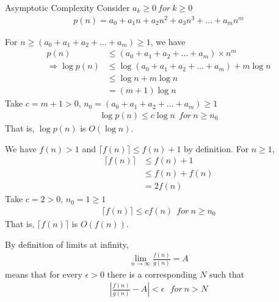 \begin{homeworkProblem}{Asymptotic Complexity}
    Consider $a_k \geq 0~for~k \geq 0$
    \[
        \begin{split}
            p(n) = a_0 + a_1n + a_2n^2 + a_3n^3 + \dots + a_mn^m
        \end{split}
    \]

    For $n \geq (a_0 + a_1 + a_2 + \dots + a_m) \geq 1$, we have
    \[
        \begin{split}
            p(n) &\leq (a_0 + a_1 + a_2 + \dots + a_m) \times n^m
            \\
            \Rightarrow \log p(n) &\leq \log (a_0 + a_1 + a_2 + \dots + a_m) + m\log n
            \\
            &\leq \log n + m \log n
            \\
            &= (m+1) \log n
        \end{split}
    \]
    Take $c = m+1 > 0$, $n_0 = (a_0 + a_1 + a_2 + \dots + a_m) \geq 1$
    \[
        \begin{split}
            \log p(n) \leq c\log n~~for~n \geq n_0
        \end{split}
    \]
    That is, $\log p(n)$ is $O(\log n)$.


    We have $f(n) > 1$ and $\lceil f(n) \rceil \leq f(n) + 1$ by definition. For $n \geq 1$,
    \[
        \begin{split}
            \lceil f(n) \rceil &\leq f(n) + 1
            \\
            &\leq f(n) + f(n)
            \\
            &= 2f(n)
        \end{split}
    \]
    Take $c = 2 > 0$, $n_0 = 1 \geq 1$
    \[
        \begin{split}
            \lceil f(n) \rceil \leq cf(n)~~for~n \geq n_0
        \end{split}
    \]
    That is, $\lceil f(n) \rceil$ is $O(f(n))$.


    By definition of limits at infinity,
    \[
        \begin{split}
            \lim_{n \to \infty} \frac{f(n)}{g(n)} = A
        \end{split}
    \]
    means that for every $\epsilon > 0$ there is a corresponding $N$ such that
    \[
        \begin{split}
            |\frac{f(n)}{g(n)} - A| < \epsilon ~~~for~n>N
        \end{split}
    \]


\end{homeworkProblem}
